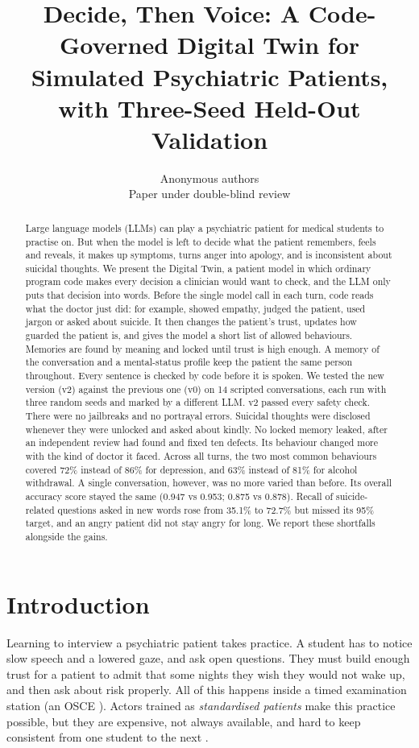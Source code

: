 \documentclass[10pt]{article}
\title{Decide, Then Voice: A Code-Governed Digital Twin for Simulated Psychiatric Patients, with Three-Seed Held-Out Validation}
\author{\name Anonymous authors\\ Paper under double-blind review}
\begin{document}
\maketitle
\begin{abstract}
Large language models (LLMs) can play a psychiatric patient for medical students to practise on. But when the model is left to
decide what the patient remembers, feels and reveals, it makes up symptoms, turns anger into apology, and is inconsistent about
suicidal thoughts. We present the Digital Twin, a patient model in which ordinary program code makes every decision a clinician would
want to check, and the LLM only puts that decision into words. Before the single model call in each turn, code reads what the doctor just did: for example, showed empathy, judged the patient, used jargon or asked about suicide. It then changes the patient's trust, updates how guarded the patient is, and gives the model a short list of allowed behaviours. Memories are found by meaning and locked until trust is
high enough. A memory of the conversation and a mental-status profile keep the patient the same person throughout. Every sentence is
checked by code before it is spoken. We tested the new version (v2) against the previous one (v0) on 14 scripted conversations, each run
with three random seeds and marked by a different LLM. v2 passed every safety check. There were no jailbreaks and no portrayal errors. Suicidal thoughts were disclosed whenever they were unlocked and asked about kindly. No locked memory leaked, after an independent review had found and fixed ten defects.
Its behaviour changed more with the kind of doctor it faced. Across all turns, the two most common behaviours covered 72\% instead of 86\% for depression, and 63\% instead of 81\% for alcohol withdrawal. A single conversation, however, was no more varied than before. Its overall accuracy score stayed the same (0.947 vs 0.953; 0.875 vs 0.878). Recall of
suicide-related questions asked in new words rose from 35.1\% to 72.7\% but missed its 95\% target, and an angry patient did not stay angry
for long. We report these shortfalls alongside the gains.
\end{abstract}

\section{Introduction}
Learning to interview a psychiatric patient takes practice. A student has to notice slow speech and a lowered gaze, and ask open questions. They must build enough trust for a patient to admit that some nights they wish they would not wake up, and then ask about risk properly. All of this happens inside a timed examination station (an OSCE \citep{harden1975osce}). Actors trained as \emph{standardised patients} make this practice possible, but
they are expensive, not always available, and hard to keep consistent from one student to the next \citep{piot2021simulation}.
\end{document}
